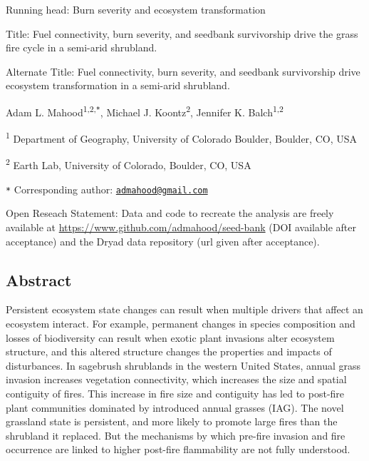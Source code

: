 \documentclass[
  12pt,
]{article}
\author{}
\date{\vspace{-2.5em}}
\begin{document}

Running head: Burn severity and ecosystem transformation

Title: Fuel connectivity, burn severity, and seedbank survivorship drive
the grass fire cycle in a semi-arid shrubland.

Alternate Title: Fuel connectivity, burn severity, and seedbank
survivorship drive ecosystem transformation in a semi-arid shrubland.

Adam L. Mahood\textsuperscript{1,2,\texttt{*}}, Michael J.
Koontz\textsuperscript{2}, Jennifer K. Balch\textsuperscript{1,2}

\small

\textsuperscript{1} Department of Geography, University of Colorado
Boulder, Boulder, CO, USA

\textsuperscript{2} Earth Lab, University of Colorado, Boulder, CO, USA

\texttt{*} Corresponding author:
\href{mailto:admahood@gmail.com}{\nolinkurl{admahood@gmail.com}}

\normalsize

Open Reseach Statement: Data and code to recreate the analysis are
freely available at \url{https://www.github.com/admahood/seed-bank} (DOI
available after acceptance) and the Dryad data repository (url given
after acceptance).

\newpage

\linenumbers

\hypertarget{abstract}{%
\subsection{Abstract}\label{abstract}}

Persistent ecosystem state changes can result when multiple drivers that
affect an ecosystem interact. For example, permanent changes in species
composition and losses of biodiversity can result when exotic plant
invasions alter ecosystem structure, and this altered structure changes
the properties and impacts of disturbances. In sagebrush shrublands in
the western United States, annual grass invasion increases vegetation
connectivity, which increases the size and spatial contiguity of fires.
This increase in fire size and contiguity has led to post-fire plant
communities dominated by introduced annual grasses (IAG). The novel
grassland state is persistent, and more likely to promote large fires
than the shrubland it replaced. But the mechanisms by which pre-fire
invasion and fire occurrence are linked to higher post-fire flammability
are not fully understood.
\end{document}
